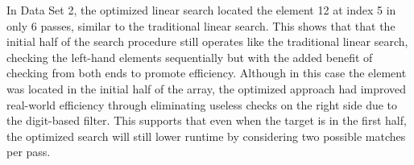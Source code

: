 In Data Set 2, the optimized linear search  located the element 12 at index 5 in only 6 passes, similar to the traditional linear search. This shows that  that the initial half of the search procedure still operates like the traditional linear search, checking the left-hand elements sequentially but with the added benefit of checking from both ends to promote efficiency. Although in this case the element was located in the initial half of the array, the optimized approach had improved real-world efficiency through eliminating useless checks on the right side due to the digit-based filter. This supports that even when the target is in the first half, the optimized search will still lower runtime by considering two possible matches per pass.

